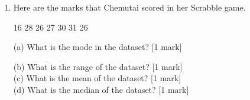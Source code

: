\documentclass{article}
\begin{document}
\begin{enumerate}
\newpage
\begin{flushleft}
 (b) How long did he take? \hspace{2cm} [1 mark] \\
 \vspace{50pt}
 (c) If he wanted to take 16 minutes in his journey, which bus would he take? \hspace{2cm} [1 mark] \\  
 \vspace{50pt}
 (d) If he wanted to take 26 minutes in his journey , which bus would he take? \hspace{2cm} [1 mark] \\
 \vspace{50pt}
 \end{flushleft}

\vspace{10pt}
\hline
\vspace{5pt}

\item \quad Here are the marks that Chemutai scored in her Scrabble game. \\
\begin{center}
16 \hspace{1cm} 28 \hspace{1cm}  26 \hspace{1cm}  27 \hspace{1cm}  30 \hspace{1cm}  31 \hspace{1cm}  26 \hspace{1cm}     
\end{center}

\begin{flushleft}
(a) What is the mode in the dataset? \hspace{2cm} [1 mark] \\
\vspace{50pt}

(b) What is the range of the dataset? \hspace{2cm} [1 mark] \\
\vspace{50pt}
(c) What is the mean of the dataset? \hspace{2cm} [1 mark] \\
\vspace{50pt}
(d) What is the median of the dataset? \hspace{2cm} [1 mark] \\
\vspace{50pt}
\end{flushleft}


\end{enumerate}
\end{document}
